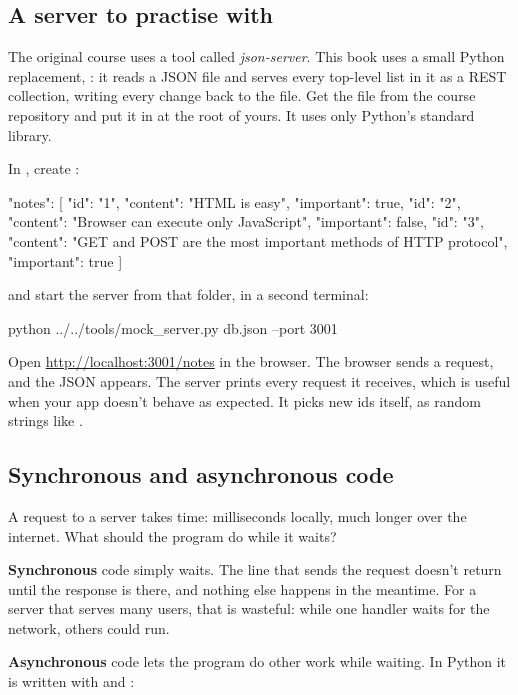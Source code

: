 \subsection{A server to practise with}

The original course uses a tool called \emph{json-server}. This book uses a small Python replacement, : it reads a JSON file and serves every top-level list in it as a REST collection, writing every change back to the file. Get the file from the course repository and put it in  at the root of yours. It uses only Python's standard library.

In , create :

\begin{code}
{
  "notes": [
    {"id": "1", "content": "HTML is easy", "important": true},
    {"id": "2", "content": "Browser can execute only JavaScript", "important": false},
    {"id": "3", "content": "GET and POST are the most important methods of HTTP protocol", "important": true}
  ]
}
\end{code}

and start the server from that folder, in a second terminal:

\begin{code}
python ../../tools/mock_server.py db.json --port 3001
\end{code}

Open \url{http://localhost:3001/notes} in the browser. The browser sends a  request, and the JSON appears. The server prints every request it receives, which is useful when your app doesn't behave as expected. It picks new ids itself, as random strings like .

\subsection{Synchronous and asynchronous code}

A request to a server takes time: milliseconds locally, much longer over the internet. What should the program do while it waits?

\textbf{Synchronous} code simply waits. The line that sends the request doesn't return until the response is there, and nothing else happens in the meantime. For a server that serves many users, that is wasteful: while one handler waits for the network, others could run.

\textbf{Asynchronous} code lets the program do other work while waiting. In Python it is written with  and :

